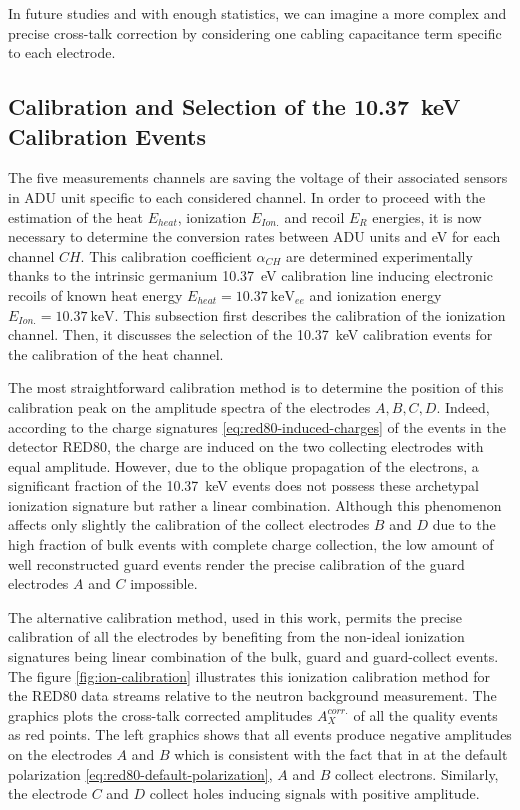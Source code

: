 In future studies and with enough statistics, we can imagine a more complex and precise cross-talk correction by considering one cabling capacitance term specific to each electrode.


\subsection{Calibration and Selection of the \SI{10.37}{\kilo\eV} Calibration Events}
\label{par:ion-calibration}
\label{par:heat-calibration}
\label{par:10kev-selection}

The five measurements channels are saving the voltage of their associated sensors in ADU unit specific to each considered channel. In order to proceed with the estimation of the heat $E_{heat}$, ionization $E_{Ion.}$ and recoil $E_R$ energies, it is now necessary to determine the conversion rates between ADU units and \si{\eV} for each channel $CH$. This calibration coefficient $\alpha_{CH}$ are determined experimentally thanks to the intrinsic germanium \SI{10.37}{\eV} calibration line inducing electronic recoils of known heat energy $E_{heat} = \SI{10.37}{\kilo\eV_{ee}}$ and ionization energy $E_{Ion.} = \SI{10.37}{\kilo\eV}$. This subsection first describes the calibration of the ionization channel. Then, it discusses the selection of the \SI{10.37}{\kilo\eV} calibration events for the calibration of the heat channel.

The most straightforward calibration method is to determine the position of this calibration peak on the amplitude spectra of the electrodes $A,B,C,D$. Indeed, according to the charge signatures \ref{eq:red80-induced-charges} of the events in the detector RED80, the charge are induced on the two collecting electrodes with equal amplitude. However, due to the oblique propagation of the electrons, a significant fraction of the \SI{10.37}{\kilo\eV} events does not possess these archetypal ionization signature but rather a linear combination. Although this phenomenon affects only slightly the calibration of the collect electrodes $B$ and $D$ due to the high fraction of bulk events with complete charge collection, the low amount of well reconstructed guard events render the precise calibration of the guard electrodes $A$ and $C$ impossible. 

The alternative calibration method, used in this work, permits the precise calibration of all the electrodes by benefiting from the non-ideal ionization signatures being linear combination of the bulk, guard and guard-collect events. The figure \ref{fig:ion-calibration} illustrates this ionization calibration method for the RED80 data streams relative to the neutron background measurement. The graphics plots the cross-talk corrected amplitudes $A_X^{corr.}$ of all the quality events as red points. The left graphics shows that all events produce negative amplitudes on the electrodes $A$ and $B$ which is consistent with the fact that in at the default polarization \ref{eq:red80-default-polarization}, $A$ and $B$ collect electrons. Similarly, the electrode $C$ and $D$ collect holes inducing signals with positive amplitude.

